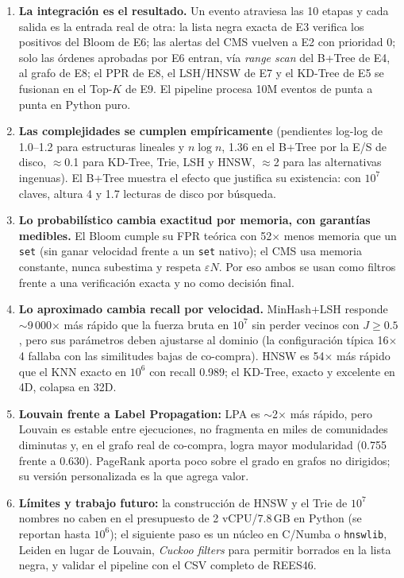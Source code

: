 \begin{enumerate}[leftmargin=1.3em]
\item \textbf{La integración es el resultado.} Un evento atraviesa las 10 etapas y cada salida es la entrada real de otra: la lista negra exacta de E3 verifica los
positivos del Bloom de E6; las alertas del CMS vuelven a E2 con prioridad 0; solo las órdenes aprobadas por E6 entran, vía \emph{range scan} del B+Tree de E4, al grafo
de E8; el PPR de E8, el LSH/HNSW de E7 y el KD-Tree de E5 se fusionan en el Top-$K$ de E9. El pipeline procesa 10M eventos de punta a punta en Python puro.
\item \textbf{Las complejidades se cumplen empíricamente} (pendientes log-log de 1.0–1.2 para estructuras lineales y $n\log n$, 1.36 en el B+Tree por la E/S de disco, $\approx$0.1 para KD-Tree, Trie, LSH y HNSW,
$\approx$2 para las alternativas ingenuas). El B+Tree muestra el efecto que justifica su existencia: con $10^7$ claves, altura 4 y 1.7 lecturas de disco por búsqueda.
\item \textbf{Lo probabilístico cambia exactitud por memoria, con garantías medibles.} El Bloom cumple su FPR teórica con 52$\times$ menos memoria que un \texttt{set}
(sin ganar velocidad frente a un \texttt{set} nativo); el CMS usa memoria constante, nunca subestima y respeta $\varepsilon N$. Por eso ambos se usan como filtros
frente a una verificación exacta y no como decisión final.
\item \textbf{Lo aproximado cambia recall por velocidad.} MinHash+LSH responde $\sim$9\,000$\times$ más rápido que la fuerza bruta en $10^7$ sin perder vecinos con
$J\ge0.5$, pero sus parámetros deben ajustarse al dominio (la configuración típica 16$\times$4 fallaba con las similitudes bajas de co-compra). HNSW es 54$\times$ más rápido
que el KNN exacto en $10^6$ con recall 0.989; el KD-Tree, exacto y excelente en 4D, colapsa en 32D.
\item \textbf{Louvain frente a Label Propagation:} LPA es $\sim$2$\times$ más rápido, pero Louvain es estable entre ejecuciones, no fragmenta en miles de comunidades
diminutas y, en el grafo real de co-compra, logra mayor modularidad (0.755 frente a 0.630). PageRank aporta poco sobre el grado en grafos no dirigidos; su versión
personalizada es la que agrega valor.
\item \textbf{Límites y trabajo futuro:} la construcción de HNSW y el Trie de $10^7$ nombres no caben en el presupuesto de 2 vCPU/7.8\,GB en Python (se reportan hasta $10^6$);
el siguiente paso es un núcleo en C/Numba o \texttt{hnswlib}, Leiden en lugar de Louvain, \emph{Cuckoo filters} para permitir borrados en la lista negra, y validar el
pipeline con el CSV completo de REES46.
\end{enumerate}
